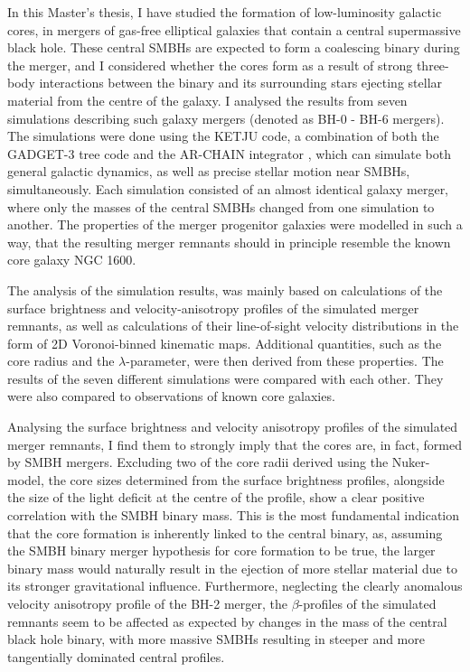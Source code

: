 \documentclass[english, twoside]{HYgradu}
\begin{document}
In this Master's thesis, I have studied the formation of low-luminosity galactic cores, in mergers of gas-free elliptical galaxies that contain a central supermassive black hole. These central SMBHs are expected to form a coalescing binary during the merger, and I considered whether the cores form as a result of strong three-body interactions between the binary and its surrounding stars ejecting stellar material from the centre of the galaxy. I analysed the results from seven simulations describing such galaxy mergers (denoted as BH-0 - BH-6 mergers). The simulations were done using the KETJU code, a combination of both the GADGET-3 tree code \citep{Springel2005} and the AR-CHAIN integrator \citep{Mikkola2008ARCHAIN}, which can simulate both general galactic dynamics, as well as precise stellar motion near SMBHs, simultaneously. Each simulation consisted of an almost identical galaxy merger, where only the masses of the central SMBHs changed from one simulation to another. The properties of the merger progenitor galaxies were modelled in such a way, that the resulting merger remnants should in principle resemble the known core galaxy NGC 1600.

The analysis of the simulation results, was mainly based on calculations of the surface brightness and velocity-anisotropy profiles of the simulated merger remnants, as well as calculations of their line-of-sight velocity distributions in the form of 2D Voronoi-binned kinematic maps. Additional quantities, such as the core radius and the $\lambda$-parameter, were then derived from these properties. The results of the seven different simulations were compared with each other. They were also compared to observations of known core galaxies.

Analysing the surface brightness and velocity anisotropy profiles of the simulated merger remnants, I find them to strongly imply that the cores are, in fact, formed by SMBH mergers. Excluding two of the core radii derived using the Nuker-model, the core sizes determined from the surface brightness profiles, alongside the size of the light deficit at the centre of the profile, show a clear positive correlation with the SMBH binary mass. This is the most fundamental indication that the core formation is inherently linked to the central binary, as, assuming the SMBH binary merger hypothesis for core formation to be true, the larger binary mass would naturally result in the ejection of more stellar material due to its stronger gravitational influence. Furthermore, neglecting the clearly anomalous velocity anisotropy profile of the BH-2 merger, the $\beta$-profiles of the simulated remnants seem to be affected as expected by changes in the mass of the central black hole binary, with more massive SMBHs resulting in steeper and more tangentially dominated central profiles. 
\end{document}
